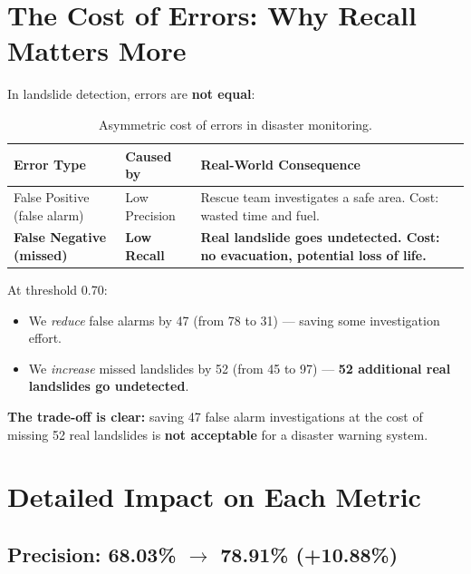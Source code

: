 \documentclass[11pt]{article}
\begin{document}
\section{The Cost of Errors: Why Recall Matters More}

In landslide detection, errors are \textbf{not equal}:

\begin{table}[H]
\centering
\renewcommand{\arraystretch}{1.3}
\begin{tabularx}{\textwidth}{llX}
\toprule
\textbf{Error Type} & \textbf{Caused by} & \textbf{Real-World Consequence} \\
\midrule
False Positive (false alarm) & Low Precision & Rescue team investigates a safe area. Cost: wasted time and fuel. \\
\rowcolor{warnred}
\textbf{False Negative (missed)} & \textbf{Low Recall} & \textbf{Real landslide goes undetected. Cost: no evacuation, potential loss of life.} \\
\bottomrule
\end{tabularx}
\caption{Asymmetric cost of errors in disaster monitoring.}
\end{table}

\noindent At threshold 0.70:
\begin{itemize}[noitemsep]
    \item We \textit{reduce} false alarms by 47 (from 78 to 31) --- saving some investigation effort.
    \item We \textit{increase} missed landslides by 52 (from 45 to 97) --- \textbf{52 additional real landslides go undetected}.
\end{itemize}

\noindent\textbf{The trade-off is clear:} saving 47 false alarm investigations at the cost of missing 52 real landslides is \textbf{not acceptable} for a disaster warning system.

\section{Detailed Impact on Each Metric}

\subsection{Precision: 68.03\% $\to$ 78.91\% (\textcolor{green!60!black}{+10.88\%})}
\end{document}
